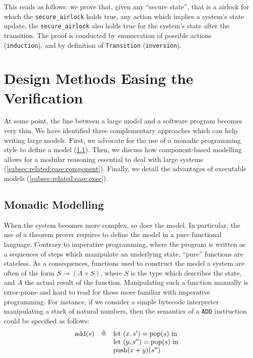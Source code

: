 \begin{example}
  \inputminted[firstline=40,lastline=57]{coq}{Listings/Airlock.v}

  This reads as follows: we prove that, given any ``secure state'', that is a
  airlock for which the \texttt{secure\_airlock} holds true, any action which
  implies a system's state update, the \texttt{secure\_airlock} also holds true
  for the system's state after the transition.
  The proof is conducted by enumeration of possible actions
  (\texttt{induction}), and by definition of \texttt{Transition}
  (\texttt{inversion}).
\end{example}

\section{Design Methods Easing the Verification}
\label{sec:related:ease}

At some point, the line between a large model and a software program becomes
very thin.
%
We have identified three complementary approaches which can help writing large
models.
%
First, we advocate for the use of a monadic programming style to define a model
(\ref{subsec:related:ease:monad}).
%
Then, we discuss how component-based modelling allows for a modular reasoning
essential to deal with large systems (\ref{subsec:related:ease:component}).
%
Finally, we detail the advantages of executable models
(\ref{subsec:related:ease:exec}).

\subsection{Monadic Modelling}
\label{subsec:related:ease:monad}

When the system becomes more complex, so does the model.
%
In particular, the use of a theorem prover requires to define the model in a
pure functional language.
%
Contrary to imperative programming, where the program is written as a sequences
of steps which manipulate an underlying state, ``pure'' functions are stateless.
%
As a consequences, functions used to construct the model a system are often of
the form $S \rightarrow (A \times S)$, where $S$ is the type which describes the
state, and $A$ the actual result of the function.
%
Manipulating such a function manually is error-prone and hard to read for those
more familiar with imperative programming.
%
For instance, if we consider a simple bytecode interpreter manipulating a stack
of natural numbers, then the semantics of a \texttt{ADD} instruction could be
specified as follows:
%
\[\begin{array}{rcl}
    \mathrm{add}(s) &\triangleq& \text{let }(x, s') = \mathrm{pop}(s) \text{ in} \\
                  &          & \text{let }(y, s'') = \mathrm{pop}(s) \text{ in} \\
                  &          & \mathrm{push}(x + y)(s'')
  \end{array}\]


